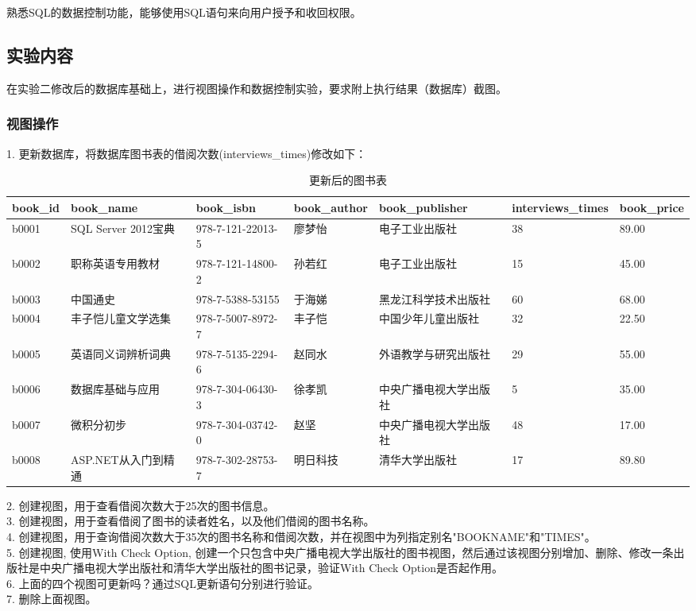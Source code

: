\documentclass[a4paper]{article}
\begin{document}
熟悉SQL的数据控制功能，能够使用SQL语句来向用户授予和收回权限。

\subsection{实验内容}

在实验二修改后的数据库基础上，进行视图操作和数据控制实验，要求附上执行结果（数据库）截图。

\subsubsection{视图操作}

1. 更新数据库，将数据库图书表的借阅次数(interviews\_times)修改如下：

\begin{table}[H]
\centering
\caption{更新后的图书表}
\label{tab:updated_books}
\begin{tabular}{|p{1.2cm}|p{2.5cm}|p{2.5cm}|p{2.5cm}|p{2.5cm}|p{1.5cm}|p{1.5cm}|}
\hline
\textbf{book\_id} & \textbf{book\_name} & \textbf{book\_isbn} & \textbf{book\_author} & \textbf{book\_publisher} & \textbf{interviews\_times} & \textbf{book\_price} \\
\hline
b0001 & SQL Server 2012宝典 & 978-7-121-22013-5 & 廖梦怡 & 电子工业出版社 & 38 & 89.00 \\
\hline
b0002 & 职称英语专用教材 & 978-7-121-14800-2 & 孙若红 & 电子工业出版社 & 15 & 45.00 \\
\hline
b0003 & 中国通史 & 978-7-5388-53155 & 于海娣 & 黑龙江科学技术出版社 & 60 & 68.00 \\
\hline
b0004 & 丰子恺儿童文学选集 & 978-7-5007-8972-7 & 丰子恺 & 中国少年儿童出版社 & 32 & 22.50 \\
\hline
b0005 & 英语同义词辨析词典 & 978-7-5135-2294-6 & 赵同水 & 外语教学与研究出版社 & 29 & 55.00 \\
\hline
b0006 & 数据库基础与应用 & 978-7-304-06430-3 & 徐孝凯 & 中央广播电视大学出版社 & 5 & 35.00 \\
\hline
b0007 & 微积分初步 & 978-7-304-03742-0 & 赵坚 & 中央广播电视大学出版社 & 48 & 17.00 \\
\hline
b0008 & ASP.NET从入门到精通 & 978-7-302-28753-7 & 明日科技 & 清华大学出版社 & 17 & 89.80 \\
\hline
\end{tabular}
\end{table}

2. 创建视图，用于查看借阅次数大于25次的图书信息。\\
3. 创建视图，用于查看借阅了图书的读者姓名，以及他们借阅的图书名称。\\
4. 创建视图，用于查询借阅次数大于35次的图书名称和借阅次数，并在视图中为列指定别名"BOOKNAME"和"TIMES"。\\
5. 创建视图, 使用With Check Option, 创建一个只包含中央广播电视大学出版社的图书视图，然后通过该视图分别增加、删除、修改一条出版社是中央广播电视大学出版社和清华大学出版社的图书记录，验证With Check Option是否起作用。\\
6. 上面的四个视图可更新吗？通过SQL更新语句分别进行验证。\\
7. 删除上面视图。
\end{document}
